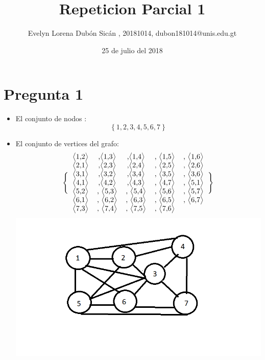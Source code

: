 \documentclass{article}
\author{Evelyn Lorena Dubón Sicán , 20181014, dubon181014@unis.edu.gt}
\title{Repeticion Parcial 1}
\date{25 de julio del 2018}
\begin{document}
\maketitle

\section{Pregunta 1}
\begin{itemize}
    \item El conjunto de nodos : \[ 
\left \{
  1, 2, 3, 4, 5, 6, 7
\right \}
\]
    \item  El conjunto de vertices del grafo:\[ 
\Bigg \{
  \begin{tabular}{cccccc}
\big\langle1,2\big\rangle &,\big\langle1,3\big\rangle &,\big\langle1,4\big\rangle &, \big\langle1,5\big\rangle &, \big\langle1,6\big\rangle \\
\big\langle2,1\big\rangle &,\big\langle2,3\big\rangle &,\big\langle2,4\big\rangle &, \big\langle2,5\big\rangle &, \big\langle2,6\big\rangle \\
\big\langle3,1\big\rangle &,\big\langle3,2\big\rangle &,\big\langle3,4\big\rangle &, \big\langle3,5\big\rangle &, \big\langle3,6\big\rangle \\
\big\langle4,1\big\rangle &,\big\langle4,2\big\rangle &,\big\langle4,3\big\rangle &, \big\langle4,7\big\rangle &, \big\langle5,1\big\rangle \\
\big\langle5,2\big\rangle &, \big\langle5,3\big\rangle &, \big\langle5,4\big\rangle &, \big\langle5,6\big\rangle &, \big\langle5,7\big\rangle \\
\big\langle6,1\big\rangle &, \big\langle6,2\big\rangle &, \big\langle6,3\big\rangle &, \big\langle6,5\big\rangle &, \big\langle6,7\big\rangle \\
\big\langle7,3\big\rangle &, \big\langle7,4\big\rangle &, \big\langle7,5\big\rangle &, \big\langle7,6\big\rangle
  \end{tabular}
  \Bigg \}
\] 
\center \includegraphics{Grafo.png}    
\end{itemize}
\end{document}

